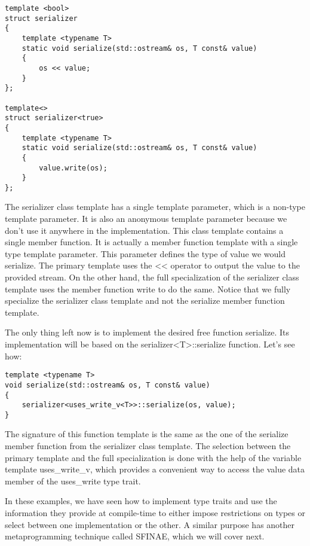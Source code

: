\begin{lstlisting}[style=styleCXX]
template <bool>
struct serializer
{
	template <typename T>
	static void serialize(std::ostream& os, T const& value)
	{
		os << value;
	}
};

template<>
struct serializer<true>
{
	template <typename T>
	static void serialize(std::ostream& os, T const& value)
	{
		value.write(os);
	}
};
\end{lstlisting}

The serializer class template has a single template parameter, which is a non-type template parameter. It is also an anonymous template parameter because we don’t use it anywhere in the implementation. This class template contains a single member function.
It is actually a member function template with a single type template parameter. This parameter defines the type of value we would serialize. The primary template uses the << operator to output the value to the provided stream. On the other hand, the full specialization of the serializer class template uses the member function write to do the same. Notice that we fully specialize the serializer class template and not the serialize member function template.

The only thing left now is to implement the desired free function serialize.
Its implementation will be based on the serializer<T>::serialize function.
Let’s see how:

\begin{lstlisting}[style=styleCXX]
template <typename T>
void serialize(std::ostream& os, T const& value)
{
	serializer<uses_write_v<T>>::serialize(os, value);
}
\end{lstlisting}

The signature of this function template is the same as the one of the serialize member function from the serializer class template. The selection between the primary template and the full specialization is done with the help of the variable template uses\_write\_v, which provides a convenient way to access the value data member of the uses\_write type trait.

In these examples, we have seen how to implement type traits and use the information they provide at compile-time to either impose restrictions on types or select between one implementation or the other. A similar purpose has another metaprogramming technique called SFINAE, which we will cover next.


























